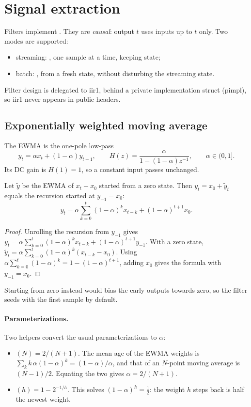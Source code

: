 \documentclass[11pt,a4paper]{article}
\begin{document}
\section{Signal extraction}\label{sec:signal}

Filters implement . They are \emph{causal}: output $t$ uses inputs up to
$t$ only. Two modes are supported:
\begin{itemize}
  \item streaming: , one sample at a time, keeping state;
  \item batch: , from a fresh state, without disturbing the streaming
        state.
\end{itemize}
Filter design is delegated to iir1, behind a private implementation struct (pimpl), so iir1
never appears in public headers.

\subsection{Exponentially weighted moving average}
The EWMA is the one-pole low-pass
\[
  y_t=\alpha x_t+(1-\alpha)y_{t-1},\qquad H(z)=\frac{\alpha}{1-(1-\alpha)z^{-1}},\qquad \alpha\in(0,1].
\]
Its DC gain is $H(1)=1$, so a constant input passes unchanged.

\begin{proposition}[Seeding]
Let $\tilde y$ be the EWMA of $x_t-x_0$ started from a zero state. Then $y_t=x_0+\tilde y_t$
equals the recursion started at $y_{-1}=x_0$:
\[
  y_t=\alpha\sum_{k=0}^{t}(1-\alpha)^k x_{t-k}+(1-\alpha)^{t+1}x_0 .
\]
\end{proposition}
\begin{proof}
Unrolling the recursion from $y_{-1}$ gives
$y_t=\alpha\sum_{k=0}^{t}(1-\alpha)^kx_{t-k}+(1-\alpha)^{t+1}y_{-1}$. With a zero state,
$\tilde y_t=\alpha\sum_{k=0}^t(1-\alpha)^k(x_{t-k}-x_0)$. Using
$\alpha\sum_{k=0}^t(1-\alpha)^k=1-(1-\alpha)^{t+1}$, adding $x_0$ gives the formula with
$y_{-1}=x_0$.
\end{proof}
Starting from zero instead would bias the early outputs towards zero, so the filter seeds
with the first sample by default.

\paragraph{Parameterizations.} Two helpers convert the usual parameterizations to $\alpha$:
\begin{itemize}
  \item {}$(N)=2/(N+1)$. The mean age of the EWMA weights is
        $\sum_k k\,\alpha(1-\alpha)^k=(1-\alpha)/\alpha$, and that of an $N$-point moving
        average is $(N-1)/2$. Equating the two gives $\alpha=2/(N+1)$.
  \item {}$(h)=1-2^{-1/h}$. This solves $(1-\alpha)^h=\tfrac12$:
        the weight $h$ steps back is half the newest weight.
\end{itemize}
\end{document}
